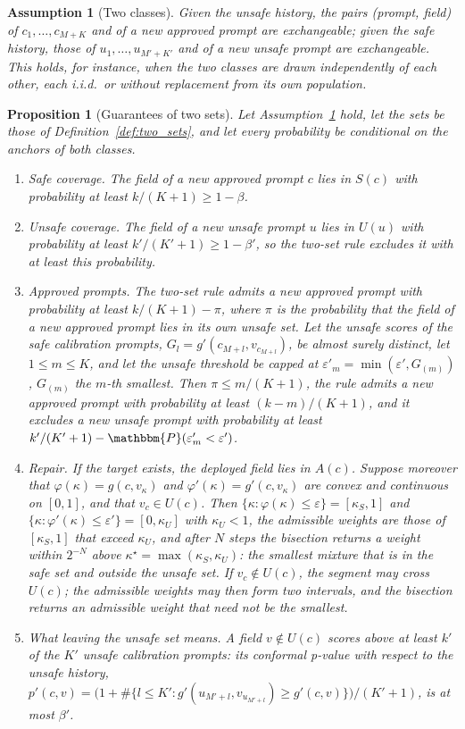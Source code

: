 \documentclass{article}
\newcommand{\PP}{\mathbbm{P}}
\theoremstyle{plain}
\newtheorem{proposition}[theorem]{Proposition}
\newtheorem{assumption}[theorem]{Assumption}
\theoremstyle{remark}
\begin{document}
\begin{assumption}[Two classes]\label{as:two_classes}
Given the unsafe history, the pairs (prompt, field) of $c_1,\dots,c_{M+K}$ and of a new approved prompt are exchangeable; given the safe
history, those of $u_1,\dots,u_{M'+K'}$ and of a new unsafe prompt are exchangeable. This holds, for instance, when the two classes are
drawn independently of each other, each i.i.d.\ or without replacement from its own population.
\end{assumption}

\begin{proposition}[Guarantees of two sets]\label{pr:two_sets}
Let Assumption~\ref{as:two_classes} hold, let the sets be those of Definition~\ref{def:two_sets}, and let every probability be conditional
on the anchors of both classes.
\begin{enumerate}[label=(\roman*)]
\item \emph{Safe coverage.} The field of a new approved prompt $c$ lies in $S(c)$ with probability at least $k/(K+1)\ge1-\beta$.
\item \emph{Unsafe coverage.} The field of a new unsafe prompt $u$ lies in $U(u)$ with probability at least $k'/(K'+1)\ge1-\beta'$, so the
two-set rule excludes it with at least this probability.
\item \emph{Approved prompts.} The two-set rule admits a new approved prompt with probability at least $k/(K+1)-\pi$, where $\pi$ is the
probability that the field of a new approved prompt lies in its own unsafe set. Let the unsafe scores of the safe calibration prompts,
$G_l=g'(c_{M+l},v_{c_{M+l}})$, be almost surely distinct, let $1\le m\le K$, and let the unsafe threshold be capped at
$\varepsilon'_m=\min(\varepsilon',G_{(m)})$, $G_{(m)}$ the $m$-th smallest. Then $\pi\le m/(K+1)$, the rule admits a new approved prompt
with probability at least $(k-m)/(K+1)$, and it excludes a new unsafe prompt with probability at least
$k'/(K'+1)-\PP(\varepsilon'_m<\varepsilon')$.
\item \emph{Repair.} If the target exists, the deployed field lies in $A(c)$. Suppose moreover that $\varphi(\kappa)=g(c,v_\kappa)$ and
$\varphi'(\kappa)=g'(c,v_\kappa)$ are convex and continuous on $[0,1]$, and that $v_c\in U(c)$. Then $\{\kappa:\varphi(\kappa)\le\varepsilon\}=[\kappa_S,1]$
and $\{\kappa:\varphi'(\kappa)\le\varepsilon'\}=[0,\kappa_U]$ with $\kappa_U<1$, the admissible weights are those of $[\kappa_S,1]$ that exceed
$\kappa_U$, and after $N$ steps the bisection returns a weight within $2^{-N}$ above $\kappa^\star=\max(\kappa_S,\kappa_U)$: the smallest
mixture that is in the safe set and outside the unsafe set. If $v_c\notin U(c)$, the segment may cross $U(c)$; the admissible weights may
then form two intervals, and the bisection returns an admissible weight that need not be the smallest.
\item \emph{What leaving the unsafe set means.} A field $v\notin U(c)$ scores above at least $k'$ of the $K'$ unsafe calibration
prompts: its conformal p-value with respect to the unsafe history,
$p'(c,v)=\big(1+\#\{l\le K':g'(u_{M'+l},v_{u_{M'+l}})\ge g'(c,v)\}\big)/(K'+1)$, is at most $\beta'$.
\end{enumerate}
\end{proposition}
\end{document}
